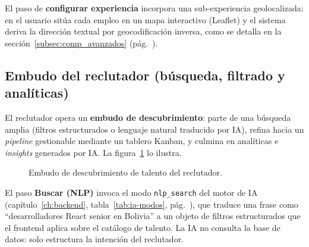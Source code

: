 El paso de \textbf{configurar experiencia} incorpora una sub-experiencia geolocalizada:
en  el usuario sitúa cada empleo en un mapa interactivo
(Leaflet) y el sistema deriva la dirección textual por geocodificación inversa, como se
detalla en la sección~\ref{subsec:comp_avanzados} (pág.~\pageref{subsec:comp_avanzados}).

\subsection{Embudo del reclutador (búsqueda, filtrado y analíticas)}
\label{subsec:flow_reclutador}

El reclutador opera un \textbf{embudo de descubrimiento}: parte de una búsqueda amplia
(filtros estructurados o lenguaje natural traducido por IA), refina hacia un
\textit{pipeline} gestionable mediante un tablero Kanban, y culmina en analíticas e
\textit{insights} generados por IA. La figura~\ref{fig:flow-recruiter} lo ilustra.

\vspace{0.3cm}
\begin{figure}[h!]
\centering
{}
\caption{Embudo de descubrimiento de talento del reclutador.}
\label{fig:flow-recruiter}
\end{figure}

\begin{AvisoNota}
El paso \textbf{Buscar (NLP)} invoca el modo \texttt{nlp\_search} del motor de IA
(capítulo~\ref{ch:backend}, tabla~\ref{tab:ia-modos}, pág.~\pageref{tab:ia-modos}), que
traduce una frase como ``desarrolladores React senior en Bolivia'' a un objeto de filtros
estructurados que el frontend aplica sobre el catálogo de talento. La IA no consulta la
base de datos: solo estructura la intención del reclutador.
\end{AvisoNota}

